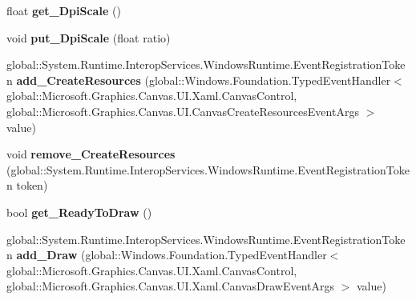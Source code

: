 \begin{DoxyCompactItemize}
\item 
\mbox{\label{interface_microsoft_1_1_graphics_1_1_canvas_1_1_u_i_1_1_xaml_1_1_i_canvas_control_aa82b042e077fa0bf256753af653fd201}} 
float {\bfseries get\+\_\+\+Dpi\+Scale} ()
\item 
\mbox{\label{interface_microsoft_1_1_graphics_1_1_canvas_1_1_u_i_1_1_xaml_1_1_i_canvas_control_a6e1d54ce91aed2c4bb4394e089748342}} 
void {\bfseries put\+\_\+\+Dpi\+Scale} (float ratio)
\item 
\mbox{\label{interface_microsoft_1_1_graphics_1_1_canvas_1_1_u_i_1_1_xaml_1_1_i_canvas_control_a8a6d5efad4792d05ccdb1542d9522d15}} 
global\+::\+System.\+Runtime.\+Interop\+Services.\+Windows\+Runtime.\+Event\+Registration\+Token {\bfseries add\+\_\+\+Create\+Resources} (global\+::\+Windows.\+Foundation.\+Typed\+Event\+Handler$<$ global\+::\+Microsoft.\+Graphics.\+Canvas.\+U\+I.\+Xaml.\+Canvas\+Control, global\+::\+Microsoft.\+Graphics.\+Canvas.\+U\+I.\+Canvas\+Create\+Resources\+Event\+Args $>$ value)
\item 
\mbox{\label{interface_microsoft_1_1_graphics_1_1_canvas_1_1_u_i_1_1_xaml_1_1_i_canvas_control_a48c306eacb3c3028e82658d035cc92b5}} 
void {\bfseries remove\+\_\+\+Create\+Resources} (global\+::\+System.\+Runtime.\+Interop\+Services.\+Windows\+Runtime.\+Event\+Registration\+Token token)
\item 
\mbox{\label{interface_microsoft_1_1_graphics_1_1_canvas_1_1_u_i_1_1_xaml_1_1_i_canvas_control_af948766c9a45fe4b177283cc36deb1ad}} 
bool {\bfseries get\+\_\+\+Ready\+To\+Draw} ()
\item 
\mbox{\label{interface_microsoft_1_1_graphics_1_1_canvas_1_1_u_i_1_1_xaml_1_1_i_canvas_control_aab6814607ac46d5dfa2fdff6dbb0fa3c}} 
global\+::\+System.\+Runtime.\+Interop\+Services.\+Windows\+Runtime.\+Event\+Registration\+Token {\bfseries add\+\_\+\+Draw} (global\+::\+Windows.\+Foundation.\+Typed\+Event\+Handler$<$ global\+::\+Microsoft.\+Graphics.\+Canvas.\+U\+I.\+Xaml.\+Canvas\+Control, global\+::\+Microsoft.\+Graphics.\+Canvas.\+U\+I.\+Xaml.\+Canvas\+Draw\+Event\+Args $>$ value)

\end{DoxyCompactItemize}
